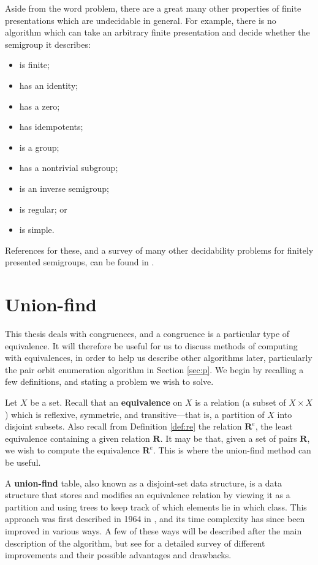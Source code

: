 Aside from the word problem, there are a great many other properties of finite
presentations which are undecidable in general.  For example, there is no
algorithm which can take an arbitrary finite presentation and decide whether the
semigroup it describes:
\begin{itemize}
\item is finite;
\item has an identity;
\item has a zero;
\item has idempotents;
\item is a group;
\item has a nontrivial subgroup;
\item is an inverse semigroup;
\item is regular; or
\item is simple.
\end{itemize}
References for these, and a survey of many other decidability problems for
finitely presented semigroups, can be found in \cite{cain_maltcev}.

\section{Union-find}
\label{sec:union-find}
This thesis deals with congruences, and a congruence is a particular type of
equivalence.  It will therefore be useful for us to discuss methods of computing
with equivalences, in order to help us describe other algorithms later,
particularly the pair orbit enumeration algorithm in Section \ref{sec:p}.  We
begin by recalling a few definitions, and stating a problem we wish to solve.

Let $X$ be a set.  Recall that an \textbf{equivalence} on $X$ is a relation (a
subset of $X \times X$) which is reflexive, symmetric, and transitive---that is,
a partition of $X$ into disjoint subsets.  Also recall from Definition
\ref{def:re} the relation $\mathbf{R}^e$, the least equivalence containing a
given relation $\mathbf{R}$.  It may be that, given a set of pairs $\mathbf{R}$,
we wish to compute the equivalence $\mathbf{R}^e$.  This is where the union-find
method can be useful.

A \textbf{union-find} table, also known as a disjoint-set data structure, is a
data structure that stores and modifies an equivalence relation by viewing it as
a partition and using trees to keep track of which elements lie in which class.
This approach was first described in 1964 in \cite{galler_1964}, and its time
complexity has since been improved in various ways.  A few of these ways will be
described after the main description of the algorithm, but see \cite{galil_1991}
for a detailed survey of different improvements and their possible advantages
and drawbacks.

